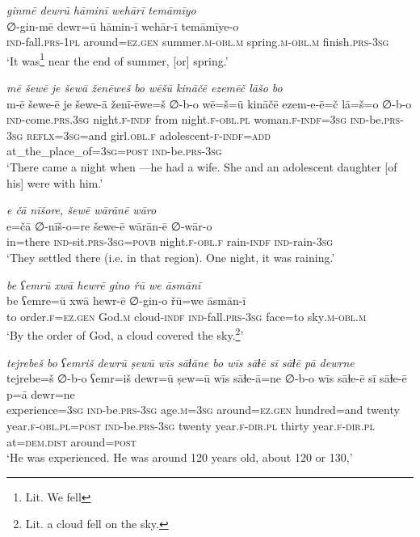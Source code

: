 \ea \label{ZB.7}
\textit{ginmē dewrū hāminī wehārī temāmīyo} \\ 
\gll ∅-gin-mē dewr=ū hāmin-ī wehār-ī temāmīye-o \\ 
 \textsc{ind-}fall\textsc{.prs}\textsc{-1pl} around\textsc{\textsc{=ez.gen}} summer\textsc{.m}\textsc{-obl}\textsc{.m} spring\textsc{.m}\textsc{-obl}\textsc{.m} finish\textsc{.prs}\textsc{-3sg} \\ 
\glt `It was\footnote{Lit. We fell} near the end of summer, [or] spring.'
\z 
 
\ea \label{ZB.8}
\textit{mē šewē je šewā ženēweš bo wēšū kināčē ezemēč lāšo bo} \\ 
\gll m-ē šewe-ē je šewe-ā ženī-ēwe=š ∅-b-o wē=š=ū kināčē ezem-e-ē=č lā=š=o ∅-b-o \\ 
 \textsc{ind-}come\textsc{.prs}\textsc{.3sg} night\textsc{.f}\textsc{-indf} from night\textsc{.f}\textsc{-obl}\textsc{.pl} woman\textsc{.f}\textsc{-indf}\textsc{=3sg} \textsc{ind-}be\textsc{.prs}\textsc{-3sg} \textsc{reflx}\textsc{=3sg}=and girl\textsc{.obl}\textsc{.f} adolescent\textsc{-f}\textsc{-indf}\textsc{=add} at\_the\_place\_of\textsc{=3sg}\textsc{=\textsc{post}} \textsc{ind-}be\textsc{.prs}\textsc{-3sg} \\ 
\glt `There came a night when —he had a wife. She and an adolescent daughter [of his] were with him.'
\z 
 
\ea \label{ZB.10}
\textit{e čā nīšore, šewē wārānē wāro} \\ 
\gll e=čā ∅-nīš-o=re šewe-ē wārān-ē ∅-wār-o \\ 
 in=there \textsc{ind-}sit\textsc{.prs}\textsc{-3sg}\textsc{=\textsc{povb}} night\textsc{.f}\textsc{-obl}\textsc{.f} rain\textsc{-indf} \textsc{ind-}rain\textsc{-3sg} \\ 
\glt `They settled there (i.e. in that region). One night, it was raining.'
\z 
 
\ea \label{ZB.11}
\textit{be ʕemrū xwā hewrē gino řū we āsmānī} \\ 
\gll be ʕemre=ū xwā hewr-ē ∅-gin-o řū=we āsmān-ī \\ 
 to order\textsc{.f}\textsc{\textsc{=ez.gen}} God\textsc{.m} cloud\textsc{-indf} \textsc{ind-}fall\textsc{.prs}\textsc{-3sg} face=to sky\textsc{.m}\textsc{-obl}\textsc{.m} \\ 
\glt `By the order of God, a cloud covered the sky.\footnote{Lit. a cloud fell on the sky.}'
\z 
 
\ea \label{ZB.12}
\textit{tejrebeš bo ʕemriš dewrū ṣewū wīs sāɫāne bo wīs sāɫē sī sāɫē pā dewrne} \\ 
\gll tejrebe=š ∅-b-o ʕemr=iš dewr=ū ṣew=ū wīs sāɫe-ā=ne ∅-b-o wīs sāɫe-ē sī sāɫe-ē p=ā dewr=ne \\ 
 experience\textsc{=3sg} \textsc{ind-}be\textsc{.prs}\textsc{-3sg} age\textsc{.m}\textsc{=3sg} around\textsc{\textsc{=ez.gen}} hundred=and twenty year\textsc{.f}\textsc{-obl}\textsc{.pl}\textsc{=\textsc{post}} \textsc{ind-}be\textsc{.prs}\textsc{-3sg} twenty year\textsc{.f}\textsc{-dir}\textsc{.pl} thirty year\textsc{.f}\textsc{-dir}\textsc{.pl} at=\textsc{dem.dist} around\textsc{=\textsc{post}} \\ 
\glt `He was experienced. He was around 120 years old, about 120 or 130,'
\z 
 
